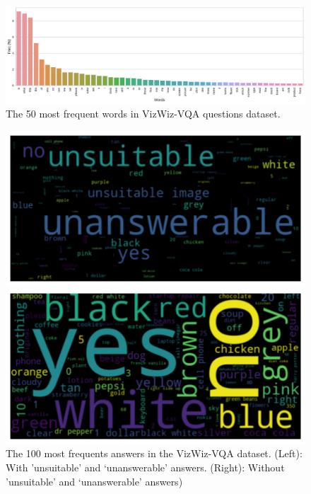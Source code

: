 \begin{figure}[ht!]
    \centering
    \includegraphics[width=\linewidth]{images/pre/fd_top50_qs_words.pdf}
 \caption{The 50 most frequent words in VizWiz-VQA questions dataset.}
\label{fig:frec_word_qs}
\end{figure}


\begin{figure}[ht!]
    \centering
    \begin{minipage}[c]{0.49\linewidth}
        \includegraphics[width=\textwidth]{images/pre/wc_top100_best_ans.pdf}
    \end{minipage}
    \begin{minipage}[c]{0.49\linewidth}
        \includegraphics[width=\textwidth]{images/pre/wc_top100_best_ans_red.pdf}
    \end{minipage}
    \caption{The 100 most frequents answers in the VizWiz-VQA dataset. (Left): With 'unsuitable' and `unanswerable' answers. (Right): Without 'unsuitable' and `unanswerable' answers)}
    \label{fig:wc_ans}
\end{figure}

